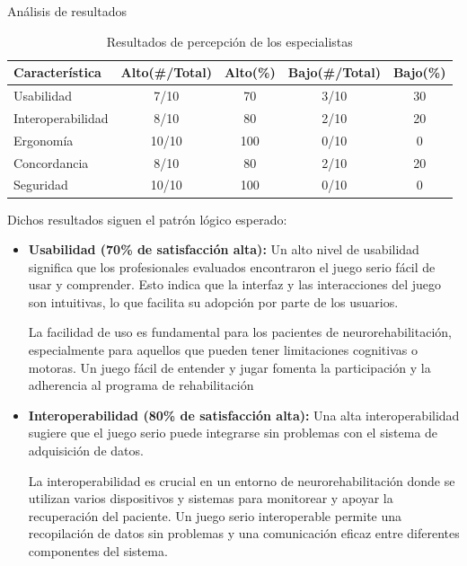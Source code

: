 \begin{thesischapter}{3} {Análisis de resultados}
    \begin{table}[ht]
        \centering
        \begin{tabular}{p{3cm} c c c c}
            \hline
            Característica      &  Alto(\#/Total)   &  Alto(\%) & Bajo(\#/Total)  & Bajo(\%) \\\hline
            Usabilidad          &  7/10   &  70   & 3/10  &   30\\
            Interoperabilidad   &  8/10   &  80   & 2/10  &   20\\
            Ergonomía           &  10/10  &  100  & 0/10  &   0\\
            Concordancia        &  8/10   &  80   & 2/10  &   20\\
            Seguridad           &  10/10  &  100  & 0/10  &   0\\
            \hline        
        \end{tabular}        
        \caption{Resultados de percepción de los especialistas}
        \label{table:test}
    \end{table}
    \vspace{10pt}
    Dichos resultados siguen el patrón lógico esperado:
    \begin{itemize}
        \item \textbf{Usabilidad (70\% de satisfacción alta):} Un alto nivel de usabilidad significa que los profesionales evaluados encontraron el juego serio fácil de usar y comprender. Esto indica que la interfaz y las interacciones del juego son intuitivas, lo que facilita su adopción por parte de los usuarios.
        
        La facilidad de uso es fundamental para los pacientes de neurorehabilitación, especialmente para aquellos que pueden tener limitaciones cognitivas o motoras. Un juego fácil de entender y jugar fomenta la participación y la adherencia al programa de rehabilitación


        \item \textbf{Interoperabilidad (80\% de satisfacción alta):} Una alta interoperabilidad sugiere que el juego serio puede integrarse sin problemas con 
        el sistema de adquisición de datos.
        
        La interoperabilidad es crucial en un entorno de neurorehabilitación donde se utilizan varios dispositivos y sistemas para monitorear y apoyar la recuperación 
        del paciente. Un juego serio interoperable permite una recopilación de datos sin problemas y una comunicación eficaz entre diferentes componentes del sistema.



\end{itemize}
\end{thesischapter}
